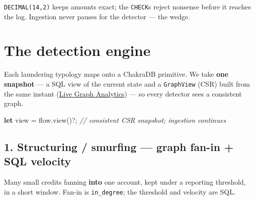 \documentclass[
  11pt,
  openany]{book}
\newenvironment{Shaded}{}{}
\newcommand{\CommentTok}[1]{\textcolor[rgb]{0.38,0.63,0.69}{\textit{#1}}}
\newcommand{\KeywordTok}[1]{\textcolor[rgb]{0.00,0.44,0.13}{\textbf{#1}}}
\newcommand{\NormalTok}[1]{#1}
\newcommand{\OperatorTok}[1]{\textcolor[rgb]{0.40,0.40,0.40}{#1}}
\begin{document}
\texttt{DECIMAL(14,2)} keeps amounts exact; the \texttt{CHECK}s reject
nonsense before it reaches the log. Ingestion never pauses for the
detector --- the wedge.

\section{The detection engine}\label{the-detection-engine}

Each laundering typology maps onto a ChakraDB primitive. We take
\textbf{one snapshot} --- a SQL view of the current state and a
\texttt{GraphView} (CSR) built from the same instant
(\href{../graph/snapshot.md}{Live Graph Analytics}) --- so every
detector sees a consistent graph.

\begin{Shaded}
\begin{Highlighting}[]
\KeywordTok{let}\NormalTok{ view }\OperatorTok{=}\NormalTok{ flow}\OperatorTok{.}\NormalTok{view()}\OperatorTok{?;}   \CommentTok{// consistent CSR snapshot; ingestion continues}
\end{Highlighting}
\end{Shaded}

\subsection{1. Structuring / smurfing --- graph fan-in + SQL
velocity}\label{structuring-smurfing-graph-fan-in-sql-velocity}

Many small credits fanning \textbf{into} one account, kept under a
reporting threshold, in a short window. Fan-in is \texttt{in\_degree};
the threshold and velocity are SQL.
\end{document}
